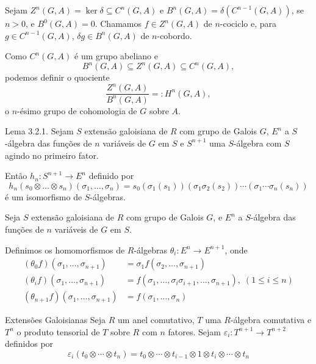 \documentclass{beamer}
\begin{document}
\begin{frame}
    Sejam $Z^n(G,A)=\ker{\delta} \subseteq C^n(G,A)$ e $B^n(G,A)=\delta(C^{n-1}(G,A))$, se $n>0$, e $B^0(G,A)=0$. Chamamos $f\in Z^n(G,A)$ de $n$-cociclo e, para $g \in C^{n-1}(G,A)$, $\delta g \in B^n(G,A)$ de $n$-cobordo.
    
    \vspace{18pt}
    
    Como $C^n(G,A)$ é um grupo abeliano e
    \[B^n(G,A) \subseteq Z^n(G,A) \subseteq C^n(G,A),\]
    podemos definir o quociente \[\dfrac{Z^n(G,A)}{B^n(G,A)} =: H^n(G,A),\]
    o $n$-ésimo grupo de cohomologia de $G$ sobre $A$.
\end{frame}

\begin{frame}{Lema 3.2.1.}
    Sejam $S$ extensão galoisiana de $R$ com grupo de Galois $G$, $E^n$ a $S$-álgebra das funções de $n$ variáveis de $G$ em $S$ e $S^{n+1}$ uma $S$-álgebra com $S$ agindo no primeiro fator.
    
    \vspace{18pt}
    
    Então $h_n: S^{n+1}\rightarrow E^n$ definido por
    \[h_n(s_0 \otimes \dots \otimes s_n)(\sigma_1,\dots,\sigma_n) = s_0\left( \sigma_1(s_1)\right)\left( \sigma_1\sigma_2(s_2)\right) \cdots \left(\sigma_1\cdots\sigma_n(s_n)\right)\] é um isomorfismo de $S$-álgebras.
\end{frame}


\begin{frame}
    Seja $S$ extensão galoisiana de $R$ com grupo de Galois $G$, e $E^n$ a $S$-álgebra das funções de $n$ variáveis de $G$ em $S$.
    
    Definimos os homomorfismos de $R$-álgebras $\theta_i: E^n \rightarrow E^{n+1}$, onde
    \begin{align*}
        (\theta_0 f) (\sigma_1,\dots,\sigma_{n+1})     &=\sigma_1f(\sigma_2,\dots,\sigma_{n+1})\\
        (\theta_i f) (\sigma_1,\dots,\sigma_{n+1})     &= f(\sigma_1, \dots, \sigma_i\sigma_{i+1},\dots, \sigma_{n+1}),\; (1\leq i \leq n)\\
        (\theta_{n+1} f) (\sigma_1,\dots,\sigma_{n+1})  &= f(\sigma_1,\dots,\sigma_n)
    \end{align*}
\end{frame}

\begin{frame}{Extensões Galoisianas}
    Seja $R$ um anel comutativo, $T$ uma $R$-álgebra comutativa e $T^n$ o produto tensorial de $T$ sobre $R$ com $n$ fatores. Sejam $\varepsilon_i: T^{n+1} \rightarrow T^{n+2}$ definidos por
    \[\varepsilon_i(t_0\otimes\cdots\otimes t_n) = t_0 \otimes \cdots \otimes t_{i-1}\otimes 1 \otimes t_i \otimes \cdots \otimes t_n\]
\end{frame}
\end{document}
